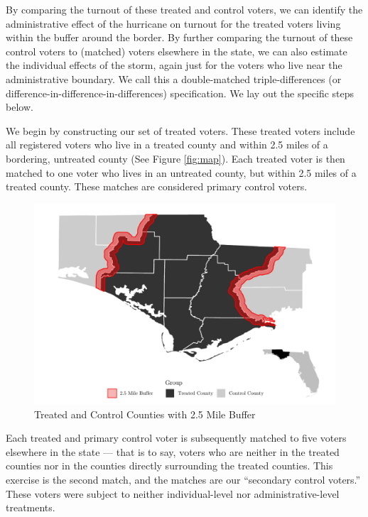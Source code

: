 \documentclass[
  12pt,
]{article}
\begin{document}
By comparing the turnout of these treated and control voters, we can identify the administrative effect of the hurricane on turnout for the treated voters living within the buffer around the border. By further comparing the turnout of these control voters to (matched) voters elsewhere in the state, we can also estimate the individual effects of the storm, again just for the voters who live near the administrative boundary. We call this a double-matched triple-differences (or difference-in-difference-in-differences) specification. We lay out the specific steps below.

We begin by constructing our set of treated voters. These treated voters include all registered voters who live in a treated county and within 2.5 miles of a bordering, untreated county (See Figure \ref{fig:map}). Each treated voter is then matched to one voter who lives in an untreated county, but within 2.5 miles of a treated county. These matches are considered primary control voters.

\begin{figure}[H]

{\centering \includegraphics{hurricane_michael_files/figure-latex/map-chunk-1} 

}

\caption{\label{fig:map}Treated and Control Counties with 2.5 Mile Buffer}\label{fig:map-chunk}
\end{figure}

Each treated and primary control voter is subsequently matched to five voters elsewhere in the state --- that is to say, voters who are neither in the treated counties nor in the counties directly surrounding the treated counties. This exercise is the second match, and the matches are our ``secondary control voters.'' These voters were subject to neither individual-level nor administrative-level treatments.
\end{document}
